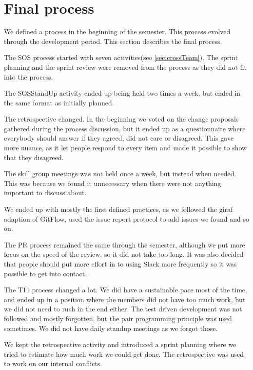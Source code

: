 \section{Final process}
We defined a process in the beginning of the semester. This process evolved through the development period. This section describes the final process. 

The \gls{SOS} process started with seven activities(see \ref{sec:crossTeam}). The sprint planning and the sprint review were removed from the process as they did not fit into the process. 

The \gls{SOSStandUp} activity ended up being held two times a week, but ended in the same format as initially planned. 

The retrospective changed. In the beginning we voted on the change proposals gathered during the process discussion, but it ended up as a questionnaire where everybody should answer if they agreed, did not care or disagreed. This gave more nuance, as it let people respond to every item and made it possible to show that they disagreed.

The skill group meetings was not held once a week, but instead when needed. This was because we found it unnecessary when there were not anything important to discuss about. 

We ended up with mostly the first defined practices, as we followed the \gls{giraf} adaption of GitFlow, used the issue report protocol to add issues we found and so on. 

The PR process remained the same through the semester, although we put more focus on the speed of the review, so it did not take too long. It was also decided that people should put more effort in to using Slack more frequently so it was possible to get into contact. 

The \gls{T11} process changed a lot. We did have a sustainable pace most of the time, and ended up in a position where the members did not have too much work, but we did not need to rush in the end either. The test driven development was not followed and mostly forgotten, but the pair programming principle was used sometimes. We did not have daily standup meetings as we forgot those. 

We kept the retrospective activity and introduced a sprint planning where we tried to estimate how much work we could get done. The retrospective was used to work on our internal conflicts. 

